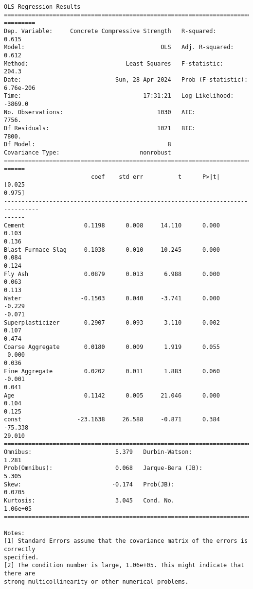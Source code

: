 \documentclass[11pt]{article}
\begin{document}
    \begin{Verbatim}[commandchars=\\\{\}]
                                  OLS Regression Results
================================================================================
=========
Dep. Variable:     Concrete Compressive Strength   R-squared:
0.615
Model:                                       OLS   Adj. R-squared:
0.612
Method:                            Least Squares   F-statistic:
204.3
Date:                           Sun, 28 Apr 2024   Prob (F-statistic):
6.76e-206
Time:                                   17:31:21   Log-Likelihood:
-3869.0
No. Observations:                           1030   AIC:
7756.
Df Residuals:                               1021   BIC:
7800.
Df Model:                                      8
Covariance Type:                       nonrobust
================================================================================
======
                         coef    std err          t      P>|t|      [0.025
0.975]
--------------------------------------------------------------------------------
------
Cement                 0.1198      0.008     14.110      0.000       0.103
0.136
Blast Furnace Slag     0.1038      0.010     10.245      0.000       0.084
0.124
Fly Ash                0.0879      0.013      6.988      0.000       0.063
0.113
Water                 -0.1503      0.040     -3.741      0.000      -0.229
-0.071
Superplasticizer       0.2907      0.093      3.110      0.002       0.107
0.474
Coarse Aggregate       0.0180      0.009      1.919      0.055      -0.000
0.036
Fine Aggregate         0.0202      0.011      1.883      0.060      -0.001
0.041
Age                    0.1142      0.005     21.046      0.000       0.104
0.125
const                -23.1638     26.588     -0.871      0.384     -75.338
29.010
==============================================================================
Omnibus:                        5.379   Durbin-Watson:                   1.281
Prob(Omnibus):                  0.068   Jarque-Bera (JB):                5.305
Skew:                          -0.174   Prob(JB):                       0.0705
Kurtosis:                       3.045   Cond. No.                     1.06e+05
==============================================================================

Notes:
[1] Standard Errors assume that the covariance matrix of the errors is correctly
specified.
[2] The condition number is large, 1.06e+05. This might indicate that there are
strong multicollinearity or other numerical problems.
    \end{Verbatim}
\end{document}
